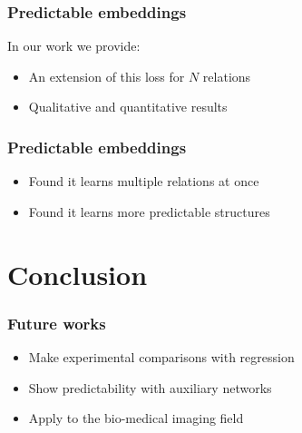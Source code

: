 \documentclass[10pt]{beamer}
\begin{document}
\begin{frame}
    \frametitle{Predictable embeddings}
    In our work we provide:
    \begin{itemize}
        \item An extension of this loss for $N$ relations
        \item Qualitative and quantitative results
    \end{itemize}

\end{frame}

\begin{frame}
    \frametitle{Predictable embeddings}
    \begin{itemize}
        \item Found it learns multiple relations at once
        \item Found it learns more predictable structures
    \end{itemize}
    \note{\begin{itemize}
        \item %
    \end{itemize}}
\end{frame}

\section{Conclusion}
\begin{frame}
    \frametitle{Future works}
    \begin{itemize}
        \item Make experimental comparisons with regression
        \item Show predictability with auxiliary networks
        \item Apply to the bio-medical imaging field
    \end{itemize}
\end{frame}
\end{document}
